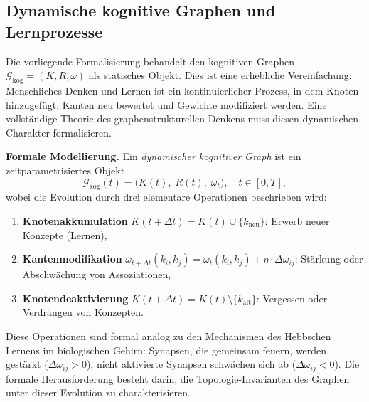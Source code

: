 ﻿\documentclass[12pt,a4paper]{article}
\theoremstyle{plain}
\theoremstyle{definition}
\theoremstyle{remark}
\newcommand{\GG}{\mathcal{G}}
\begin{document}
\subsection{Dynamische kognitive Graphen und Lernprozesse}
\label{subsec:dynamisch}

Die vorliegende Formalisierung behandelt den kognitiven Graphen $\GG_{\text{kog}} = (K, R, \omega)$ als statisches Objekt. Dies ist eine erhebliche Vereinfachung: Menschliches Denken und Lernen ist ein kontinuierlicher Prozess, in dem Knoten hinzugefügt, Kanten neu bewertet und Gewichte modifiziert werden. Eine vollständige Theorie des graphenstrukturellen Denkens muss diesen dynamischen Charakter formalisieren.

\textbf{Formale Modellierung.} Ein \emph{dynamischer kognitiver Graph} ist ein zeitparametrisiertes Objekt
\[
  \GG_{\text{kog}}(t) = \bigl(K(t),\; R(t),\; \omega_t\bigr), \quad t \in [0, T],
\]
wobei die Evolution durch drei elementare Operationen beschrieben wird:
\begin{enumerate}[label=(\alph*)]
  \item \textbf{Knotenakkumulation} $K(t+\Delta t) = K(t) \cup \{k_{\text{neu}}\}$: Erwerb neuer Konzepte (Lernen),
  \item \textbf{Kantenmodifikation} $\omega_{t+\Delta t}(k_i, k_j) = \omega_t(k_i, k_j) + \eta \cdot \Delta\omega_{ij}$: Stärkung oder Abschwächung von Assoziationen,
  \item \textbf{Knotendeaktivierung} $K(t+\Delta t) = K(t) \setminus \{k_{\text{alt}}\}$: Vergessen oder Verdrängen von Konzepten.
\end{enumerate}

Diese Operationen sind formal analog zu den Mechanismen des Hebbschen Lernens im biologischen Gehirn: Synapsen, die gemeinsam feuern, werden gestärkt ($\Delta\omega_{ij} > 0$), nicht aktivierte Synapsen schwächen sich ab ($\Delta\omega_{ij} < 0$). Die formale Herausforderung besteht darin, die Topologie-Invarianten des Graphen unter dieser Evolution zu charakterisieren.
\end{document}
